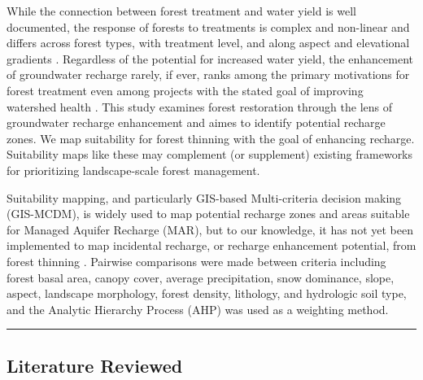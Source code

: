 \documentclass[
  number]{elsarticle}
\begin{document}
While the connection between forest treatment and water yield is well
documented, the response of forests to treatments is complex and
non-linear and differs across forest types, with treatment level, and
along aspect and elevational gradients
\citep{del_campo_global_2022, biederman_streamflow_2022, zou_streamflow_2010, hibbert1979, moore_physical_2005}.
Regardless of the potential for increased water yield, the enhancement
of groundwater recharge rarely, if ever, ranks among the primary
motivations for forest treatment even among projects with the stated
goal of improving watershed health
\citep{stanturf2014, filoso2017, allen_ecological_2002, friederici2013, odonnell2016}.
This study examines forest restoration through the lens of groundwater
recharge enhancement and aimes to identify potential recharge zones. We
map suitability for forest thinning with the goal of enhancing recharge.
Suitability maps like these may complement (or supplement) existing
frameworks for prioritizing landscape-scale forest management.

Suitability mapping, and particularly GIS-based Multi-criteria decision
making (GIS-MCDM), is widely used to map potential recharge zones and
areas suitable for Managed Aquifer Recharge (MAR), but to our knowledge,
it has not yet been implemented to map incidental recharge, or recharge
enhancement potential, from forest thinning
\citep{fathi2021, rajashekar2023}. Pairwise comparisons were made
between criteria including forest basal area, canopy cover, average
precipitation, snow dominance, slope, aspect, landscape morphology,
forest density, lithology, and hydrologic soil type, and the Analytic
Hierarchy Process (AHP) was used as a weighting method.

\begin{center}\rule{0.5\linewidth}{0.5pt}\end{center}

\subsection{Literature Reviewed}\label{literature-reviewed}
\end{document}
